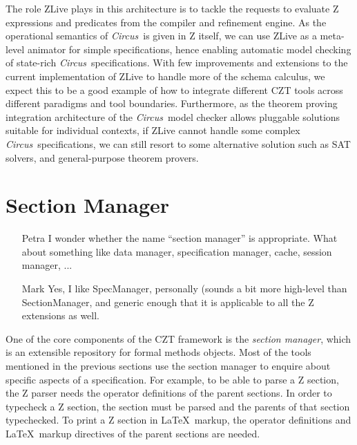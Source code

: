 \documentclass{llncs}
\newcommand{\Circus}{{\sf\slshape Circus}}
\begin{document}
    The role ZLive plays in this architecture is to tackle the
    requests to evaluate Z expressions and predicates from the
    compiler and refinement engine.  As the operational semantics of
    \Circus\ is given in Z itself, we can use ZLive as a meta-level
    animator for simple specifications, hence enabling automatic model
    checking of state-rich \Circus\ specifications.  With few
    improvements and extensions to the current implementation of ZLive
    to handle more of the schema calculus, we expect this to be a good
    example of how to integrate different CZT tools across different
    paradigms and tool boundaries. Furthermore, as the theorem proving
    integration architecture of the \Circus\ model checker allows
    pluggable solutions suitable for individual contexts, if ZLive
    cannot handle some complex \Circus\ specifications, we can still
    resort to some alternative solution such as SAT solvers, and
    general-purpose theorem provers.

\section{Section Manager}
\label{section-manager}

    \begin{itemize}
        \item[Petra] I wonder whether the name ``section manager'' is
                     appropriate.  What about something like data
                     manager, specification manager, cache, session
                     manager, ...
	\item[Mark] Yes, I like SpecManager, personally (sounds a bit
		more high-level than SectionManager, and generic enough
		that it is applicable to all the Z extensions as well.
    \end{itemize}

  One of the core components of the CZT framework is the 
  \emph{section manager}, which is an extensible repository for
  formal methods objects.
  Most of the tools mentioned in the previous sections use the
  section manager to enquire about specific aspects of a
  specification.  For example, to be able to parse a Z section, the Z
  parser needs the operator definitions of the parent sections.  In
  order to typecheck a Z section, the section must be parsed and the
  parents of that section typechecked.  To print a Z section in
  \LaTeX\ markup, the operator definitions and \LaTeX\ markup
  directives of the parent sections are needed.
\end{document}
